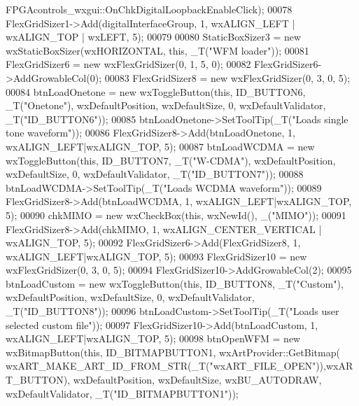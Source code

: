 \begin{DoxyCode}
      FPGAcontrols_wxgui::OnChkDigitalLoopbackEnableClick);
00078     FlexGridSizer1->Add(digitalInterfaceGroup, 1, wxALIGN\_LEFT | wxALIGN\_TOP | wxLEFT, 5);
00079 
00080     StaticBoxSizer3 = \textcolor{keyword}{new} wxStaticBoxSizer(wxHORIZONTAL, \textcolor{keyword}{this}, _T(\textcolor{stringliteral}{"WFM loader"}));
00081     FlexGridSizer6 = \textcolor{keyword}{new} wxFlexGridSizer(0, 1, 5, 0);
00082     FlexGridSizer6->AddGrowableCol(0);
00083     FlexGridSizer8 = \textcolor{keyword}{new} wxFlexGridSizer(0, 3, 0, 5);
00084     btnLoadOnetone = \textcolor{keyword}{new} wxToggleButton(\textcolor{keyword}{this}, ID\_BUTTON6, _T(\textcolor{stringliteral}{"Onetone"}), wxDefaultPosition, wxDefaultSize, 
      0, wxDefaultValidator, _T(\textcolor{stringliteral}{"ID\_BUTTON6"}));
00085     btnLoadOnetone->SetToolTip(_T(\textcolor{stringliteral}{"Loads single tone waveform"}));
00086     FlexGridSizer8->Add(btnLoadOnetone, 1, wxALIGN\_LEFT|wxALIGN\_TOP, 5);
00087     btnLoadWCDMA = \textcolor{keyword}{new} wxToggleButton(\textcolor{keyword}{this}, ID\_BUTTON7, _T(\textcolor{stringliteral}{"W-CDMA"}), wxDefaultPosition, wxDefaultSize, 0, 
      wxDefaultValidator, _T(\textcolor{stringliteral}{"ID\_BUTTON7"}));
00088     btnLoadWCDMA->SetToolTip(_T(\textcolor{stringliteral}{"Loads WCDMA waveform"}));
00089     FlexGridSizer8->Add(btnLoadWCDMA, 1, wxALIGN\_LEFT|wxALIGN\_TOP, 5);
00090     chkMIMO = \textcolor{keyword}{new} wxCheckBox(\textcolor{keyword}{this}, wxNewId(), \_(\textcolor{stringliteral}{"MIMO"}));
00091     FlexGridSizer8->Add(chkMIMO, 1, wxALIGN\_CENTER\_VERTICAL | wxALIGN\_TOP, 5);
00092     FlexGridSizer6->Add(FlexGridSizer8, 1, wxALIGN\_LEFT|wxALIGN\_TOP, 5);
00093     FlexGridSizer10 = \textcolor{keyword}{new} wxFlexGridSizer(0, 3, 0, 5);
00094     FlexGridSizer10->AddGrowableCol(2);
00095     btnLoadCustom = \textcolor{keyword}{new} wxToggleButton(\textcolor{keyword}{this}, ID\_BUTTON8, _T(\textcolor{stringliteral}{"Custom"}), wxDefaultPosition, wxDefaultSize, 0,
       wxDefaultValidator, _T(\textcolor{stringliteral}{"ID\_BUTTON8"}));
00096     btnLoadCustom->SetToolTip(_T(\textcolor{stringliteral}{"Loads user selected custom file"}));
00097     FlexGridSizer10->Add(btnLoadCustom, 1, wxALIGN\_LEFT|wxALIGN\_TOP, 5);
00098     btnOpenWFM = \textcolor{keyword}{new} wxBitmapButton(\textcolor{keyword}{this}, ID\_BITMAPBUTTON1, wxArtProvider::GetBitmap(
      wxART\_MAKE\_ART\_ID\_FROM\_STR(_T(\textcolor{stringliteral}{"wxART\_FILE\_OPEN"})),wxART\_BUTTON), wxDefaultPosition, wxDefaultSize, wxBU\_AUTODRAW, 
      wxDefaultValidator, _T(\textcolor{stringliteral}{"ID\_BITMAPBUTTON1"}));

\end{DoxyCode}
